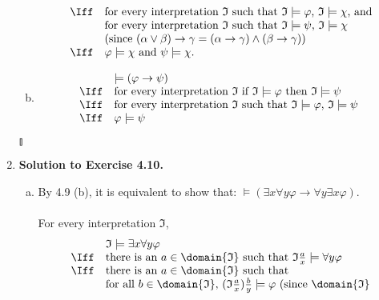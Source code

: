 \begin{enumerate}[1.]
\begin{enumerate}[(a)]
\[\begin{array}{ll}
\Iff & \mbox{for every interpretation $\mathfrak{I}$ such that $\mathfrak{I} \models \varphi$, $\mathfrak{I} \models \chi$, and} \\
\,  & \mbox{for every interpretation $\mathfrak{I}$ such that $\mathfrak{I} \models \psi$, $\mathfrak{I} \models \chi$} \\
\,  & \mbox{(since $(\alpha \lor \beta) \rightarrow \gamma = (\alpha \rightarrow \gamma) \land (\beta \rightarrow \gamma)$)} \\
\Iff & \varphi \models \chi \mbox{ and } \psi \models \chi.
\end{array}
\]
\item 
\[
\begin{array}{ll}
\,  & \models (\varphi \rightarrow \psi) \\
\Iff & \mbox{for every interpretation $\mathfrak{I}$ if $\mathfrak{I} \models \varphi$ then $\mathfrak{I} \models \psi$} \\
\Iff & \mbox{for every interpretation $\mathfrak{I}$ such that $\mathfrak{I} \models \varphi$, $\mathfrak{I} \models \psi$ } \\
\Iff & \varphi \models \psi
\end{array}
\]
\end{enumerate} \begin{flushright}$\talloblong$\end{flushright}
%
\item \textbf{Solution to Exercise 4.10.}
\begin{enumerate}[(a)]
\item By 4.9 (b), it is equivalent to show that: $\models (\exists x \forall y \varphi \rightarrow \forall y \exists x \varphi)$.\\
\ 
\\For every interpretation $\mathfrak{I}$, \\
\[
\begin{array}{ll}
\,  & \mathfrak{I} \models \exists x \forall y \varphi \\
\Iff & \mbox{there is an $a \in \domain{\mathfrak{I}}$ such that $\mathfrak{I} \frac{a}{x} \models \forall y \varphi$} \\
\Iff & \mbox{there is an $a \in \domain{\mathfrak{I}}$ such that} \\
\,  & \mbox{for all $b \in \domain{\mathfrak{I}}$, $(\mathfrak{I} \frac{a}{x}) \frac{b}{y} \models \varphi$ (since $\domain{\mathfrak{I}}$} \\

\end{array}\]
\end{enumerate}
\end{enumerate}
